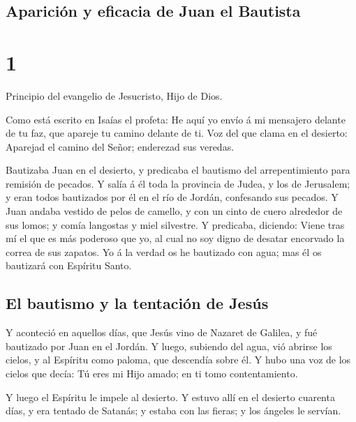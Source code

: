 \hypertarget{apariciuxf3n-y-eficacia-de-juan-el-bautista}{%
\subsection{Aparición y eficacia de Juan el
Bautista}\label{apariciuxf3n-y-eficacia-de-juan-el-bautista}}

\hypertarget{section-41-1}{%
\section{1}\label{section-41-1}}

 Principio del evangelio de Jesucristo, Hijo de Dios.

 Como está escrito en Isaías el profeta: He aquí yo envío
á mi mensajero delante de tu faz, que apareje tu camino delante de ti.
 Voz del que clama en el desierto: Aparejad el camino del
Señor; enderezad sus veredas.

 Bautizaba Juan en el desierto, y predicaba el bautismo
del arrepentimiento para remisión de pecados.  Y salía á
él toda la provincia de Judea, y los de Jerusalem; y eran todos
bautizados por él en el río de Jordán, confesando sus pecados.
 Y Juan andaba vestido de pelos de camello, y con un cinto
de cuero alrededor de sus lomos; y comía langostas y miel silvestre.
 Y predicaba, diciendo: Viene tras mí el que es más
poderoso que yo, al cual no soy digno de desatar encorvado la correa de
sus zapatos.  Yo á la verdad os he bautizado con agua; mas
él os bautizará con Espíritu Santo.

\hypertarget{el-bautismo-y-la-tentaciuxf3n-de-jesuxfas}{%
\subsection{El bautismo y la tentación de
Jesús}\label{el-bautismo-y-la-tentaciuxf3n-de-jesuxfas}}

 Y aconteció en aquellos días, que Jesús vino de Nazaret
de Galilea, y fué bautizado por Juan en el Jordán.  Y
luego, subiendo del agua, vió abrirse los cielos, y al Espíritu como
paloma, que descendía sobre él.  Y hubo una voz de los
cielos que decía: Tú eres mi Hijo amado; en ti tomo contentamiento.

 Y luego el Espíritu le impele al desierto.
 Y estuvo allí en el desierto cuarenta días, y era
tentado de Satanás; y estaba con las fieras; y los ángeles le servían.

